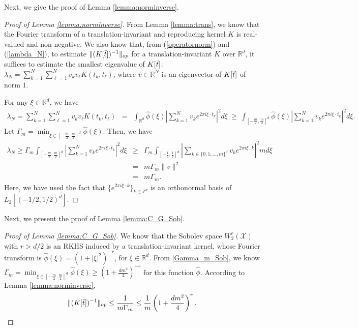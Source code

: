 \documentclass{article}
\def\ZZ{\mathbb Z}
\def\RR{\mathbb R}
\numberwithin{equation}{section}
\begin{document}
\begin{appendices}
Next, we give the proof of Lemma \ref{lemma:norminverse}.

\begin{proof}[Proof of Lemma \ref{lemma:norminverse}]
From Lemma \ref{lemma:trans}, we know that the Fourier transform of a translation-invariant and reproducing kernel $K$ is real-valued and non-negative. 
We also know that, from (\ref{operatornorm}) and (\ref{lambda_N}), to estimate  $\|(K[\Bar{t}])^{-1}\|_{op}$ for a translation-invariant $K$ over $\RR^d$, it suffices to estimate the smallest eigenvalue of $K[\Bar{t}]$: $\lambda_{N}
= \sum_{k=1}^N \sum_{\ell=1}^N v_k v_\ell K(t_k, t_\ell)$, where $v\in \RR^N$ is an eigenvector of $K[\Bar{t}]$ of norm $1$. 
    
For any $\xi \in \RR^d$, we have 
\begin{eqnarray*}
    \lambda_{N}
    = \sum_{k=1}^N \sum_{\ell=1}^N v_k v_\ell K(t_k, t_\ell) &=&  \int_{\RR^d} \widehat{\phi}(\xi)\left|\sum_{k=1}^N v_k e^{2\pi i\xi \cdot t_k}\right|^2 d\xi
   \  \geq \ \int_{[-\frac{m}{2},\frac{m}{2}]^d} \widehat{\phi}(\xi)\left|\sum_{k=1}^N v_k e^{2\pi i\xi \cdot t_k}\right|^2 d\xi.
\end{eqnarray*}
Let $\Gamma_m = \min_{\xi \in [-\frac{m}{2},\frac{m}{2}]^d} \widehat{\phi}(\xi)$. 
Then, we have 
\begin{eqnarray}\label{Gamma_m}
     \lambda_{N}  \geq \Gamma_m\int_{[-\frac{m}{2},\frac{m}{2}]^d} \left|\sum_{k=1}^N v_k e^{2\pi i\xi \cdot t_k}\right|^2 d\xi \nonumber 
     &\geq& \Gamma_m\int_{[-\frac{1}{2},\frac{1}{2}]^d} \left|\sum_{k\in \{0,1,\ldots,m\}^d} v_k e^{2\pi i\xi \cdot k}\right|^2 md\xi \nonumber\\
      &=& m \Gamma_m \|v\|^2 \nonumber\\ 
      &=& m\Gamma_m.
\end{eqnarray}
Here, we have used the fact that $\{e^{2\pi i\xi \cdot k}\}_{k\in \ZZ^d}$ is an orthonormal basis of $L_2 [(-1/2, 1/2)^d]$.
\end{proof}

Next, we present the proof of Lemma \ref{lemma:C_G_Sob}.

\begin{proof}[Proof of Lemma \ref{lemma:C_G_Sob}]
We know that the Sobolev space $W^r_2(\mathcal{X})$ with $r>d/2$ is an RKHS induced by a translation-invariant kernel, whose Fourier transform is $\widehat \phi (\xi) = (1+|\xi|^2)^{-r}$, for $ \xi \in \RR^d$. From \eqref{Gamma_m_Sob}, we know  $\Gamma_m =  \min_{\xi \in [-\frac{m}{2},\frac{m}{2}]^d} \widehat{\phi}(\xi) \geq \left(1+ \frac{dm^2}{4}\right)^{-r}$
for this function $\widehat \phi$. 
According to Lemma  \ref{lemma:norminverse},  
\begin{equation*}
    \|(K[\Bar{t}])^{-1}\|_{op} \leq  \frac{1}{m\Gamma_m} \leq \frac{1}{m}\left(1+ \frac{dm^2}{4}\right)^{r}. 
\end{equation*}


\end{proof}
\end{appendices}
\end{document}
